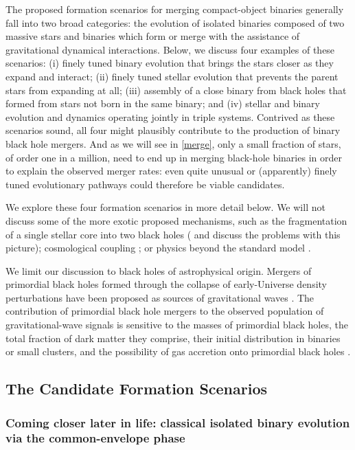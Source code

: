 \documentclass[review]{elsarticle}
\begin{document}
The proposed formation scenarios for merging compact-object binaries generally fall into two broad categories: the evolution of isolated binaries composed of two massive stars and binaries which form or merge with the assistance of gravitational dynamical interactions.  Below, we discuss four examples of these scenarios: (i) finely tuned binary evolution that brings the stars closer as they expand and interact; (ii) finely tuned stellar evolution that prevents the parent stars from expanding at all; (iii) assembly of a close binary from black holes that formed from stars not born in the same binary; and (iv) stellar and binary evolution and dynamics operating jointly in triple systems.   Contrived as these scenarios sound, all four might plausibly contribute to the production of binary black hole mergers.  And as we will see in \autoref{merge}, only a small fraction of stars, of order one in a million, need to end up in merging black-hole binaries in order to explain the observed merger rates: even quite unusual or (apparently) finely tuned evolutionary pathways could therefore be viable candidates.

We explore these four formation scenarios in more detail below. We will not discuss some of the more exotic proposed mechanisms, such as the fragmentation of a single stellar core into two black holes \citep{Loeb:2016} (\citet{Woosley:2016} and \citet{Dai:2017} discuss the problems with this picture); cosmological coupling \citep{Croker:2021}; or physics beyond the standard model \citep{Sakstein:2020}.   

We limit our discussion to black holes of astrophysical origin.   Mergers of primordial black holes formed through the collapse of early-Universe density perturbations have been proposed as sources of gravitational waves \citep{Bird:2016}.   The contribution of primordial black hole mergers to the observed population of gravitational-wave signals is sensitive to the masses of primordial black holes, the total fraction of dark matter they comprise, their initial distribution in binaries or small clusters, and the possibility of gas accretion onto primordial black holes \citep{AliHaimoud:2017, ChenHuang:2018, Korol:2019, DeLuca:2020b, DeLuca:2020a}.

\subsection{The Candidate Formation Scenarios}
\subsubsection{Coming closer later in life: classical isolated binary evolution via the common-envelope phase}
\label{form:isol}
\end{document}
